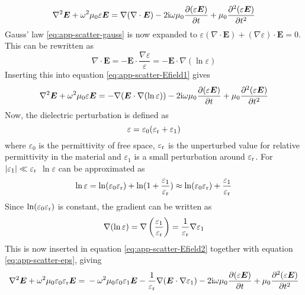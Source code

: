 \documentclass[11pt,twoside]{eitExjobb}
\begin{document}
	\begin{equation}
		\nabla^2\bm{E} + \omega^2 \mu_0 \varepsilon \bm{E} = \nabla(\nabla \cdot \bm{E}) - 2\mathrm{i} \omega \mu_0 \frac{\partial (\varepsilon \bm{E})}{\partial t} + \mu_0 \frac{\partial^2 (\varepsilon \bm{E})}{\partial t^2}
		\label{eq:app-scatter-Efield1}
	\end{equation}
	Gauss' law \eqref{eq:app-scatter-gauss} is now expanded to $\varepsilon(\nabla \cdot \bm{E}) + (\nabla \varepsilon) \cdot \bm{E} = 0$. This can be rewritten as
	\begin{equation*}
		\nabla \cdot \bm{E} = -\bm{E} \cdot \frac{\nabla \varepsilon}{\varepsilon} = -\bm{E} \cdot \nabla (\ln{\varepsilon})
	\end{equation*}
	Inserting this into equation \eqref{eq:app-scatter-Efield1} gives
	\begin{equation}
		\nabla^2\bm{E} + \omega^2 \mu_0 \varepsilon \bm{E} = -\nabla(\bm{E} \cdot \nabla (\ln{\varepsilon})) - 2\mathrm{i} \omega \mu_0 \frac{\partial (\varepsilon \bm{E})}{\partial t} + \mu_0 \frac{\partial^2 (\varepsilon \bm{E})}{\partial t^2}
		\label{eq:app-scatter-Efield2}
	\end{equation}
	Now, the dielectric perturbation is defined as
	\begin{equation}
		\varepsilon = \varepsilon_0(\varepsilon_{\mathrm{r}} + \varepsilon_1)
		\label{eq:app-scatter-eps}
	\end{equation}
	where $\varepsilon_0$ is the permittivity of free space, $\varepsilon_{\mathrm{r}}$ is the unperturbed value for relative permittivity in the material and $\varepsilon_1$ is a small perturbation around $\varepsilon_{\mathrm{r}}$. For $|\varepsilon_1| \ll \varepsilon_{\mathrm{r}}$ $\ln{\varepsilon}$ can be approximated as
	\begin{equation*}
		\ln{\varepsilon} = \ln(\varepsilon_0 \varepsilon_{\mathrm{r}}) + \ln(1 + \frac{\varepsilon_1}{\varepsilon_{\mathrm{r}}}) \approx \ln(\varepsilon_0 \varepsilon_{\mathrm{r}}) + \frac{\varepsilon_1}{\varepsilon_{\mathrm{r}}}
	\end{equation*}
	Since $\ln(\varepsilon_0 \varepsilon_{\mathrm{r}})$ is constant, the gradient can be written as
	\begin{equation*}
		\nabla(\ln{\varepsilon}) = \nabla \left( \frac{\varepsilon_1}{\varepsilon_{\mathrm{r}}} \right) = \frac{1}{\varepsilon_{\mathrm{r}}} \nabla \varepsilon_1
	\end{equation*}
	This is now inserted in equation \eqref{eq:app-scatter-Efield2} together with equation \eqref{eq:app-scatter-eps}, giving
	\begin{equation*}
		\nabla^2\bm{E} + \omega^2 \mu_0 \varepsilon_0 \varepsilon_{\mathrm{r}} \bm{E} = \\
		-\omega^2 \mu_0 \varepsilon_0 \varepsilon_1 \bm{E} -\frac{1}{\varepsilon_{\mathrm{r}}}\nabla(\bm{E} \cdot \nabla \varepsilon_1) - 2\mathrm{i} \omega \mu_0 \frac{\partial (\varepsilon \bm{E})}{\partial t} + \mu_0 \frac{\partial^2 (\varepsilon \bm{E})}{\partial t^2}
	\end{equation*}
\end{document}
